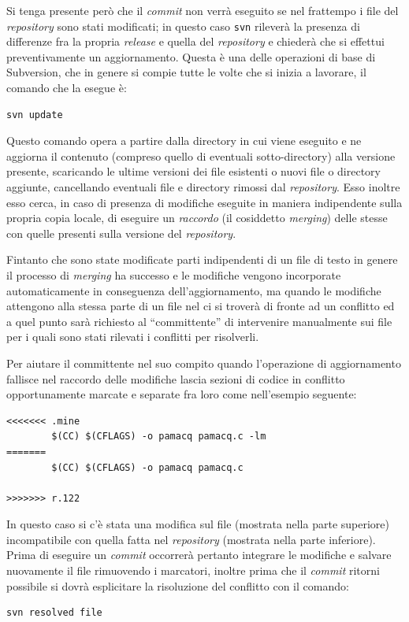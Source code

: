 Si tenga presente però che il \textit{commit} non verrà eseguito se nel
frattempo i file del \textit{repository} sono stati modificati; in questo caso
\texttt{svn} rileverà la presenza di differenze fra la propria
\textit{release} e quella del \textit{repository} e chiederà che si effettui
preventivamente un aggiornamento. Questa è una delle operazioni di base di
Subversion, che in genere si compie tutte le volte che si inizia a lavorare,
il comando che la esegue è:
\begin{verbatim}
svn update
\end{verbatim}

Questo comando opera a partire dalla directory in cui viene eseguito e ne
aggiorna il contenuto (compreso quello di eventuali sotto-directory) alla
versione presente, scaricando le ultime versioni dei file esistenti o nuovi
file o directory aggiunte, cancellando eventuali file e directory rimossi dal
\textit{repository}.  Esso inoltre esso cerca, in caso di presenza di
modifiche eseguite in maniera indipendente sulla propria copia locale, di
eseguire un \textsl{raccordo} (il cosiddetto \textit{merging}) delle stesse
con quelle presenti sulla versione del \textit{repository}.

Fintanto che sono state modificate parti indipendenti di un file di testo in
genere il processo di \textit{merging} ha successo e le modifiche vengono
incorporate automaticamente in conseguenza dell'aggiornamento, ma quando le
modifiche attengono alla stessa parte di un file nel ci si troverà di fronte
ad un conflitto ed a quel punto sarà richiesto al ``committente'' di
intervenire manualmente sui file per i quali sono stati rilevati i conflitti
per risolverli.

Per aiutare il committente nel suo compito quando l'operazione di
aggiornamento fallisce nel raccordo delle modifiche lascia sezioni di codice
in conflitto opportunamente marcate e separate fra loro come nell'esempio
seguente:
\begin{verbatim}
<<<<<<< .mine
        $(CC) $(CFLAGS) -o pamacq pamacq.c -lm
=======
        $(CC) $(CFLAGS) -o pamacq pamacq.c

>>>>>>> r.122
\end{verbatim}

In questo caso si c'è stata una modifica sul file (mostrata nella parte
superiore) incompatibile con quella fatta nel \textit{repository} (mostrata
nella parte inferiore). Prima di eseguire un \textit{commit} occorrerà
pertanto integrare le modifiche e salvare nuovamente il file rimuovendo i
marcatori, inoltre prima che il \textit{commit} ritorni possibile si dovrà
esplicitare la risoluzione del conflitto con il comando:
\begin{verbatim}
svn resolved file
\end{verbatim}

